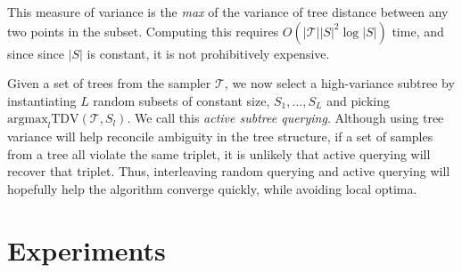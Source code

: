 This measure of variance is
the \emph{max} of the variance of tree distance between
any two points in the subset. Computing this requires
$O(|\mathcal{T}||S|^2 \log|S|)$ time, and since since $|S|$ is constant,
it is not prohibitively expensive.

Given a set of trees from the sampler $\mathcal{T}$,
we now select a high-variance subtree
by instantiating $L$ random subsets of constant size, $S_1, \ldots, S_L$
and picking $\text{argmax}_l \text{TDV}(\mathcal{T}, S_l)$.
We call this \emph{active subtree querying}.
Although using tree variance will help reconcile ambiguity in the tree structure,
if a set of samples from a tree all violate the same triplet,
it is unlikely that active querying will recover that triplet.
Thus, interleaving random querying and active querying
will hopefully help the algorithm converge quickly, while avoiding
local optima.

\section{Experiments}

